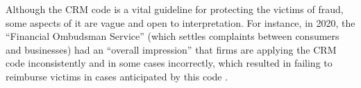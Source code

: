 Although the CRM code is a vital guideline for protecting the victims of fraud, some aspects of it are vague and open to interpretation. For instance, in 2020, the ``Financial Ombudsman Service'' (which settles complaints between consumers and businesses)  had an ``overall impression'' that firms are applying the CRM code inconsistently and in some cases incorrectly, which resulted in failing to reimburse victims in cases anticipated by this code \cite{Financial-Ombudsman-Service-response}.  %

















